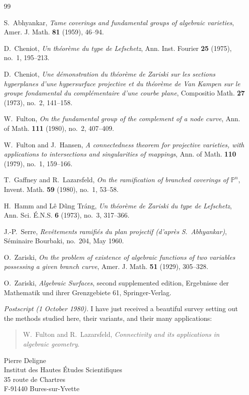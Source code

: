 \documentclass[11pt]{amsart}
\newcommand{\PP}{\mathbb{P}}
\begin{document}
\begin{thebibliography}{99}

S.~Abhyankar,
\emph{Tame coverings and fundamental groups of algebraic varieties},
Amer. J. Math. \textbf{81} (1959), 46--94.

D.~Cheniot,
\emph{Un th\'eor\`eme du type de Lefschetz},
Ann. Inst. Fourier \textbf{25} (1975), no.~1, 195--213.

D.~Cheniot,
\emph{Une d\'emonstration du th\'eor\`eme de Zariski sur les sections hyperplanes d'une hypersurface projective et du th\'eor\`eme de Van Kampen sur le groupe fondamental du compl\'ementaire d'une courbe plane},
Compositio Math. \textbf{27} (1973), no.~2, 141--158.

W.~Fulton,
\emph{On the fundamental group of the complement of a node curve},
Ann. of Math. \textbf{111} (1980), no.~2, 407--409.

W.~Fulton and J.~Hansen,
\emph{A connectedness theorem for projective varieties, with applications to intersections and singularities of mappings},
Ann. of Math. \textbf{110} (1979), no.~1, 159--166.

T.~Gaffney and R.~Lazarsfeld,
\emph{On the ramification of branched coverings of $\PP^n$},
Invent. Math. \textbf{59} (1980), no.~1, 53--58.

H.~Hamm and L\^e D\~ung Tr\'ang,
\emph{Un th\'eor\`eme de Zariski du type de Lefschetz},
Ann. Sci. \'E.N.S. \textbf{6} (1973), no.~3, 317--366.

J.-P.~Serre,
\emph{Rev\^etements ramifi\'es du plan projectif (d'apr\`es S.~Abhyankar)},
S\'eminaire Bourbaki, no.~204, May 1960.

O.~Zariski,
\emph{On the problem of existence of algebraic functions of two variables possessing a given branch curve},
Amer. J. Math. \textbf{51} (1929), 305--328.

O.~Zariski,
\emph{Algebraic Surfaces}, second supplemented edition,
Ergebnisse der Mathematik und ihrer Grenzgebiete 61, Springer-Verlag.

\end{thebibliography}

\bigskip
\noindent\emph{Postscript (1 October 1980).} I have just received a beautiful survey setting out the methods studied here, their variants, and their many applications:
\begin{quote}
W.~Fulton and R.~Lazarsfeld, \emph{Connectivity and its applications in algebraic geometry}.
\end{quote}

\bigskip
\noindent Pierre Deligne\\
Institut des Hautes \'Etudes Scientifiques\\
35 route de Chartres\\
F-91440 Bures-sur-Yvette
\end{document}
